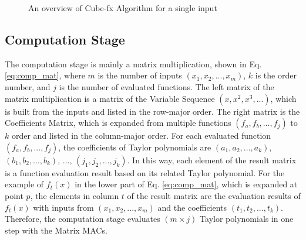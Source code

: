 \begin{figure}[t]
    \caption{An overview of Cube-fx Algorithm for a single input}
    \label{fig:overview}
    \end{figure}

\subsection{Computation Stage}

The computation stage is mainly a matrix multiplication, shown in Eq. \ref{eq:comp_mat}, where $m$ is the number of inputs $(x_1, x_2, ..., x_m)$, $k$ is the order number, and $j$ is the number of evaluated functions. The left matrix of the matrix multiplication is a matrix of the Variable Sequence $(x, x^2, x^3, ...)$, which is built from the inputs and listed in the row-major order. The right matrix is the Coefficients Matrix, which is expanded from multiple functions $(f_a, f_b, ..., f_j)$ to $k$ order and listed in the column-major order. For each evaluated function $(f_a, f_b, ..., f_j)$, the coefficients of Taylor polynomials are $(a_1, a_2, ..., a_k)$, $(b_1, b_2, ..., b_k)$, $...$, $(j_1, j_2, ..., j_k)$. In this way, each element of the result matrix is a function evaluation result based on its related Taylor polynomial. For the example of $f_t(x)$ in the lower part of Eq. \ref{eq:comp_mat}, which is expanded at point $p$, the elements in column $t$ of the result matrix are the evaluation results of $f_t(x)$ with inputs from $(x_1, x_2, ..., x_m)$ and the coefficients $(t_1, t_2, ..., t_k)$. Therefore, the computation stage evaluates $(m \times j)$ Taylor polynomials in one step with the Matrix MACs.

